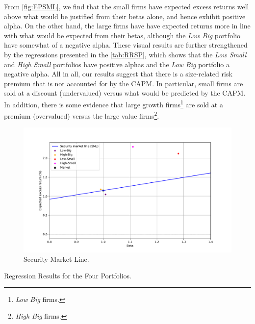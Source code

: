\documentclass[a4paper,10pt,american]{article}
\begin{document}
From \autoref{fig:EPSML}, we find that the small firms have expected 
excess returns well above what would be justified from their betas alone, 
and hence exhibit positive alpha. On the other hand, the large firms have
have expected returns more in line with what would be expected 
from their betas, although the \textit{Low Big} portfolio have somewhat of 
a negative alpha. These visual results are further strengthened by the 
regressions presented in the \autoref{tab:RRSP}, which shows that the \textit{Low Small} and \textit{High Small} portfolios have 
positive alphas and the \textit{Low Big} portfolio a negative alpha. All in all, our 
results suggest that there is a size-related risk premium that is 
not accounted for by the CAPM. In particular, small firms are sold at a discount 
(undervalued) versus what would be predicted by the CAPM. In addition, there is some
evidence that large growth firms\footnote{\textit{Low Big} firms.} are sold at a
premium (overvalued) versus the large value firms\footnote{\textit{High Big} firms.}. 

\begin{figure}[H]
\centering
\includegraphics[width=0.95\linewidth]{../Plots/ex_post_SML.pdf}
\caption{Security Market Line.}
\label{fig:EPSML}
\end{figure}


\begin{table}[H]
    \centering
    \caption{Regression Results for the Four Portfolios.}
    \label{tab:RRSP}
    
\end{table}













\newpage

\end{document}
